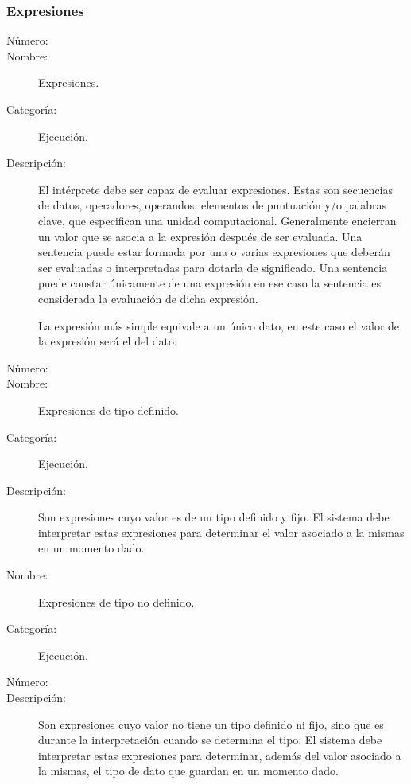 \subsubsection{Expresiones}
	\begin{description}
		\item [Número:] \cn
		\item [Nombre:] Expresiones.
		\item [Categoría:] Ejecución.
		\item [Descripción:] El intérprete debe ser capaz de evaluar expresiones. Estas son secuencias de datos, operadores, operandos,
		elementos de puntuación y/o palabras clave, que especifican una unidad computacional.
		Generalmente encierran un valor que se asocia a la expresión después de ser evaluada. Una sentencia puede estar formada por una o
		varias expresiones que deberán ser evaluadas o interpretadas para dotarla de significado. Una sentencia puede constar únicamente
		de una expresión en ese caso la sentencia es considerada la evaluación de dicha expresión.
		
		La expresión más simple equivale a un único dato, en este caso el valor de la expresión será el del dato.
	\end {description}

	\begin{description}
		\item [Número:] \cn
		\item [Nombre:] Expresiones de tipo definido.
		\item [Categoría:] Ejecución.
		\item [Descripción:] Son expresiones cuyo valor es de un tipo definido y fijo. El sistema debe interpretar estas expresiones para determinar el valor
		asociado a la mismas en un momento dado.
	\end {description}

	\begin{description}
		\item [Nombre:] Expresiones de tipo no definido.
		\item [Categoría:] Ejecución.
		\item [Número:] \cn
		\item [Descripción:] Son expresiones cuyo valor no tiene un tipo definido ni fijo, sino que es durante la interpretación cuando se determina el tipo.
		El sistema debe interpretar estas expresiones para determinar, además del valor asociado a la mismas, el tipo de dato que guardan en un momento
		dado.
	\end {description}

